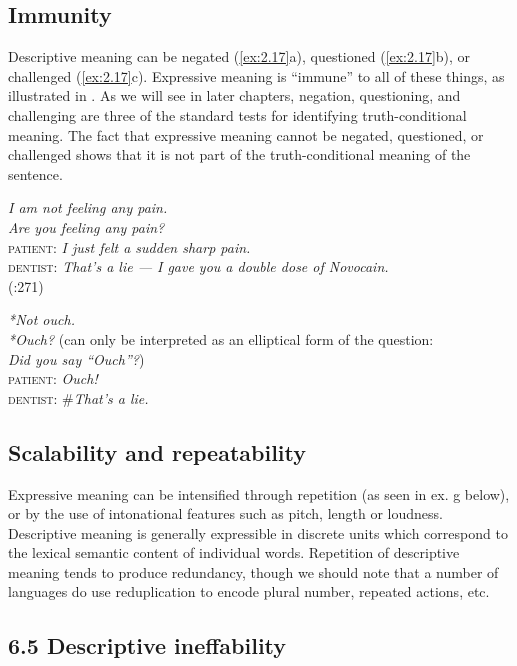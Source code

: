 \subsection{Immunity}\label{sec:} %

Descriptive meaning can be negated (\ref{ex:2.17}a), questioned (\ref{ex:2.17}b), or challenged (\ref{ex:2.17}c). Expressive meaning is “immune” to all of these things, as illustrated in . As we will see in later chapters, negation, questioning, and challenging are three of the standard tests for identifying truth-conditional meaning. The fact that expressive meaning cannot be negated, questioned, or challenged shows that it is not part of the truth-conditional meaning of the sentence.


\ea \label{ex:2.17}
\ea \textit{I am not feeling any pain.}\\
\ex \textit{Are you feeling any pain?}\\
\ex  \textsc{patient}: \textit{I just felt a sudden sharp pain.}\\
  \textsc{dentist}: \textit{That’s a lie — I gave you a double dose of Novocain.}\\
    (\citealt{Cruse1986}:271)
\z

\ea \label{ex:2.18}
\ea \textit{*Not ouch.}\\
                       \z
\ex \textit{*Ouch?}  (can only be interpreted as an elliptical form of the question:\\
    \textit{Did you say “Ouch”?})\\
\ex  \textsc{patient}: \textit{Ouch!}\\
  \textsc{dentist}: \#\textit{That’s a lie.}
                       \z
\z

\subsection{Scalability and repeatability}\label{sec:} %

Expressive meaning can be intensified through repetition (as seen in ex. g below), or by the use of intonational features such as pitch, length or loudness. Descriptive meaning is generally expressible in discrete units which correspond to the lexical semantic content of individual words. Repetition of descriptive meaning tends to produce redundancy, though we should note that a number of languages do use reduplication to encode plural number, repeated actions, etc.


\subsection{6.5 Descriptive ineffability}\label{sec:}

